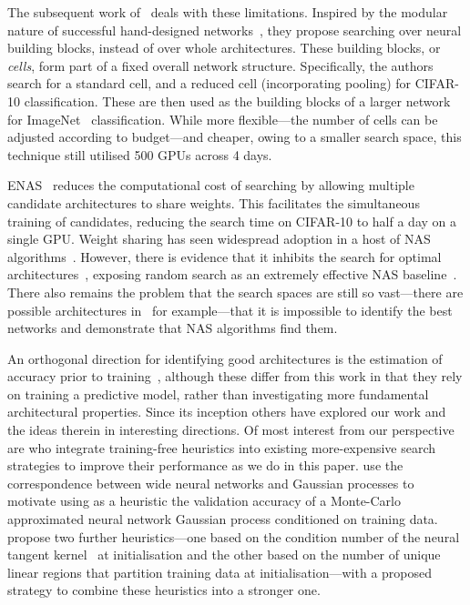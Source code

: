 \documentclass{article}
\begin{document}
The subsequent work of~\cite{zoph2018learning} deals with these limitations. Inspired by the modular nature of successful hand-designed networks~\citep{simonyan2015very,he2016deep,huang2017densely}, they propose searching over neural building blocks, instead of over whole architectures. These building blocks, or {\it cells}, form part of a fixed overall network structure. Specifically, the authors search for a standard cell, and a reduced cell (incorporating pooling) for CIFAR-10 classification. These are then used as the building blocks of a larger network for ImageNet~\citep{russakovsky2015imagenet} classification. While more flexible---the number of cells can be adjusted according to budget---and cheaper, owing to a smaller search space, this technique still utilised 500 GPUs across 4 days.

ENAS~\citep{pham2018efficient} reduces the computational cost of searching by allowing multiple candidate architectures to share weights. This facilitates the simultaneous training of candidates, reducing the search time on CIFAR-10 to half a day on a single GPU. Weight sharing has seen widespread adoption in a host of NAS algorithms~\citep{liu2019darts,luo2018neural,cai2019proxylessnas,xie2019snas,brock2018smash}. However, there is evidence that it inhibits the search for optimal architectures~\citep{yu2020evaluating}, exposing random search as an extremely effective NAS baseline~\citep{yu2020evaluating,li2019random}. There also remains the problem that the search spaces are still so vast---there are  possible architectures in~\cite{pham2018efficient} for example---that it is impossible to identify the best networks and  demonstrate that NAS algorithms find them.

An orthogonal direction for identifying good architectures is the estimation of accuracy prior to training~\citep{deng2017peephole,istrate2019tapas}, although these differ from this work in that they rely on training a predictive model, rather than investigating more fundamental architectural properties. 
Since its inception others have explored our work and the ideas therein in interesting directions. Of most interest from our perspective are \citet{abdelfattah2021zerocost} who integrate training-free heuristics into existing more-expensive search strategies to improve their performance  as we do in this paper. 
\citet{park2020towards} use the correspondence between wide neural networks and Gaussian processes to motivate using as a heuristic the validation accuracy of a Monte-Carlo approximated neural network Gaussian process conditioned on training data. \citet{chen2021neural} propose two further heuristics---one based on the condition number of the neural tangent kernel~\citep{jacot2018neural} at initialisation and the other based on the number of unique linear regions that partition training data at initialisation---with a proposed strategy to combine these heuristics into a stronger one.
\end{document}
